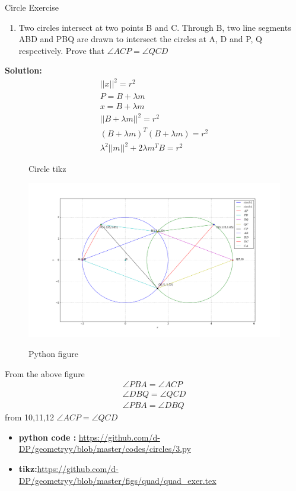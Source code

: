\begin{frame}{Circle Exercise}
\begin{enumerate}
\conti
\item Two circles intersect at two points B and C.
Through B, two line segments ABD and PBQ
are drawn to intersect the circles at A, D and
P, Q respectively. Prove that $\angle{ACP}=\angle{QCD}$
\seti
\end{enumerate}
\textbf{Solution:}
\begin{align*}
||x||^2 =r^2\\
P=B+\lambda{m}\\
x=B+\lambda{m}\\
||B+\lambda m||^2 = r^2\\
(B+\lambda m)^T(B+\lambda m) =r^2\\
\lambda ^2||m||^2 +2\lambda m^T B=r^2
\end{align*}
\end{frame}
\begin{frame}
\begin{figure}[!ht]
\resizebox{0.6\linewidth}{!}
{


}
\caption{Circle tikz}
\label{fig:foo}
\end{figure}
\end{frame}
\begin{frame}
\begin{figure}[!ht]
\resizebox{0.6\linewidth}{!}
{
\includegraphics[scale=1.2]{./figs/circles/3.png}
}
\caption{Python figure}
\label{fig:foo}
\end{figure}
\end{frame}
\begin{frame}
From the above figure
\begin{align}
\angle{PBA}=\angle{ACP}\\
\angle{DBQ}=\angle{QCD}\\
\angle{PBA}=\angle{DBQ}
\end{align}
from 10,11,12 $\angle{ACP}=\angle{QCD}$\\
\begin{itemize}
\item \textbf{python code :} \url{https://github.com/d-DP/geometryy/blob/master/codes/circles/3.py}\\
\item \textbf{tikz:}\url{https://github.com/d-DP/geometryy/blob/master/figs/quad/quad_exer.tex}
\end{itemize}
\end{frame}